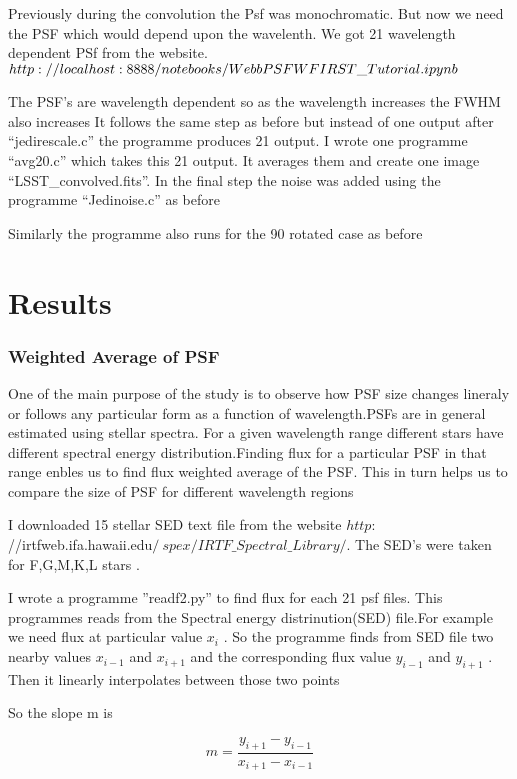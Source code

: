 Previously during the convolution the Psf was monochromatic. But now we need the PSF which would depend upon the wavelenth. We got 21 wavelength dependent PSf from the website.
$http://localhost:8888/notebooks/WebbPSF\-WFIRST\_Tutorial.ipynb$

The PSF's are wavelength dependent so as the wavelength increases the FWHM also increases
It follows the same step as before but instead of one output after ``jedirescale.c''  the programme produces 21 output. I wrote one programme
``avg20.c'' which takes this 21 output. It averages them and create one image ``LSST\_convolved.fits''. In the final step the noise was added using the programme ``Jedinoise.c'' as before


Similarly the programme also runs for the 90 rotated case as before



\chapter{Results}



\subsection{Weighted Average of PSF}

One of the main purpose of the study is to observe how PSF size changes lineraly or follows any particular form as
a function of wavelength.PSFs are in general estimated using stellar spectra. For a given wavelength range different stars
have different spectral energy distribution.Finding flux for a particular PSF in that range enbles us to find flux weighted
average of the PSF. This in turn helps us to compare the size of PSF for different wavelength regions

I downloaded 15 stellar SED text file from the website $http:$//irtfweb.ifa.hawaii.edu$/~spex/IRTF\_Spectral\_Library/$. The SED's were taken for
F,G,M,K,L stars .

I wrote a programme ''readf2.py'' to find flux for each 21 psf files. This programmes reads from the Spectral energy distrinution(SED)
file.For example we need flux at particular value $ x_i$  . So the programme finds from SED file two nearby values $ x_{i-1}$ and $ x_{i+1}$ and the
corresponding flux value $ y_{i-1}$ and $ y_{i+1}$ . Then it linearly interpolates between those two points

So the slope m is

\begin{equation}
 m = \frac{y_{i+1}-y_{i-1}}{x_{i+1}-x_{i-1}}
\end{equation}


